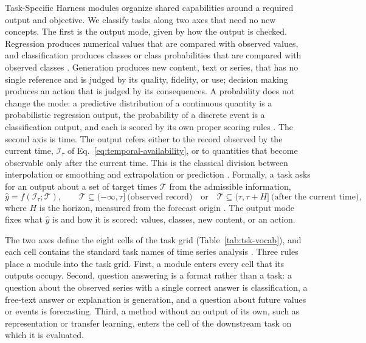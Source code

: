 \documentclass[preprints,article,submit,moreauthors]{Definitions/mdpi}
\begin{document}
Task-Specific Harness modules organize shared capabilities around a required output and objective. We classify tasks along two axes that need no new concepts. The first is the output mode, given by how the output is checked. Regression produces numerical values that are compared with observed values, and classification produces classes or class probabilities that are compared with observed classes \citep{hastie2009esl,bishop2006prml}. Generation produces new content, text or series, that has no single reference and is judged by its quality, fidelity, or use; decision making produces an action that is judged by its consequences. A probability does not change the mode: a predictive distribution of a continuous quantity is a probabilistic regression output, the probability of a discrete event is a classification output, and each is scored by its own proper scoring rules \citep{gneiting2007scoring,gneiting2011point}. The second axis is time. The output refers either to the record observed by the current time, $\mathcal{I}_\tau$ of Eq.~\eqref{eq:temporal-availability}, or to quantities that become observable only after the current time. This is the classical division between interpolation or smoothing and extrapolation or prediction \citep{wiener1949extrapolation,kalman1960filtering}. Formally, a task asks for an output about a set of target times $\mathcal{T}$ from the admissible information,
\begin{equation}
  \widehat{y}=f\!\left(\mathcal{I}_{\tau};\mathcal{T}\right),\qquad
  \mathcal{T}\subseteq(-\infty,\tau]\ \text{(observed record)}\quad\text{or}\quad
  \mathcal{T}\subseteq(\tau,\tau+H]\ \text{(after the current time)},
  \label{eq:task-contract}
\end{equation}
where $H$ is the horizon, measured from the forecast origin \citep{hyndman2021fpp}. The output mode fixes what $\widehat{y}$ is and how it is scored: values, classes, new content, or an action.

The two axes define the eight cells of the task grid (Table~\ref{tab:tsk-vocab}), and each cell contains the standard task names of time series analysis \citep{wu2023timesnet,wang2024tslib,kong2025timemqa}. Three rules place a module into the task grid. First, a module enters every cell that its outputs occupy. Second, question answering is a format rather than a task: a question about the observed series with a single correct answer is classification, a free-text answer or explanation is generation, and a question about future values or events is forecasting. Third, a method without an output of its own, such as representation or transfer learning, enters the cell of the downstream task on which it is evaluated.
\end{document}
